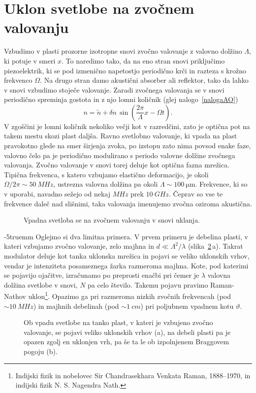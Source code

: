 \section{Uklon svetlobe na zvočnem valovanju}
Vzbudimo v plasti prozorne izotropne snovi zvočno valovanje z valovno dolžino $\Lambda$, 
ki potuje v smeri $x$. To naredimo tako, da na eno stran snovi priključimo piezoelektrik, 
ki se pod izmenično napetostjo periodično krči in razteza s krožno frekvenco $\Omega$.
Na drugo stran damo akustični absorber ali reflektor, tako da lahko 
v snovi vzbudimo stoječe valovanje. 
Zaradi zvočnega valovanja se v snovi periodično spreminja gostota in 
z njo lomni količnik (glej nalogo~\ref{nalogaAO})
\begin{equation}
n = \tilde{n} + \delta n \,\sin \left(\frac{2\pi}{\Lambda} x- \Omega t\right).
\end{equation}
V zgoščini je lomni količnik nekoliko večji kot v razredčini, zato je optična pot na takem mestu
skozi plast daljša. Ravno svetlobno valovanje, ki vpada na plast pravokotno glede
na smer širjenja zvoka, po izstopu zato nima povsod enake faze, 
valovno čelo pa je periodično modulirano s periodo 
valovne dolžine zvočnega valovanja. Zvočno valovanje v snovi torej deluje kot 
optična fazna mrežica. Tipična frekvenca, s katero vzbujamo elastično
deformacijo, je okoli $\Omega/2\pi \sim 50~\si{MHz}$, ustrezna valovna dolžina pa okoli 
$\Lambda \sim 100~\si{\micro\metre}$. Frekvence, ki so v uporabi, navadno sežejo od 
nekaj $\si{MHz}$ prek $10~\si{GHz}$. Čeprav so vse te frekvence
daleč nad slišnimi, taka valovanja imenujemo zvočna oziroma akustična. 
\begin{figure}[h]
\centering
\def\svgwidth{50truemm} 

\caption{Vpadna svetloba se na zvočnem valovanju v snovi uklanja.}
\label{fig:ao}
\end{figure}
\vglue-5truemm
Oglejmo si dva limitna primera. V prvem primeru je debelina plasti, 
v kateri vzbujamo zvočno valovanje, zelo majhna in 
$d \ll \Lambda^2/\lambda$ (slika~\ref{fig:ao_bragg}\,a).
Takrat modulator deluje kot tanka uklonska mrežica in pojavi se veliko 
uklonskih vrhov, vendar je intenziteta posameznega žarka razmeroma majhna. 
Kote, pod katerimi se pojavijo ojačitve, izračunamo po preprosti enačbi
pri čemer je $\lambda$ valovna dolžina svetlobe v snovi, $N$ pa celo število. Takemu pojavu 
pravimo Raman-Nathov uklon\footnote{Indijski fizik in nobelovec Sir Chandrasekhara 
Venkata Raman, 1888--1970, 
in indijski fizik N. S. Nagendra Nath.}. 
Opazimo ga pri razmeroma nizkih zvočnih frekvencah 
(pod $\sim10~\si{MHz}$) in majhnih debelinah (pod $\sim 1~\si{cm}$) pri poljubnem vpadnem 
kotu $\vartheta$.
\begin{figure}[h]
\centering
\def\svgwidth{120truemm} 

\caption{Ob vpadu svetlobe na tanko plast, v kateri je vzbujeno zvočno valovanje, se 
pojavi veliko uklonskih vrhov (a), na debeli plasti pa je opazen zgolj en uklonjen vrh, 
pa še ta le ob izpolnjenem Braggovem pogoju (b).}
\label{fig:ao_bragg}
\end{figure}

